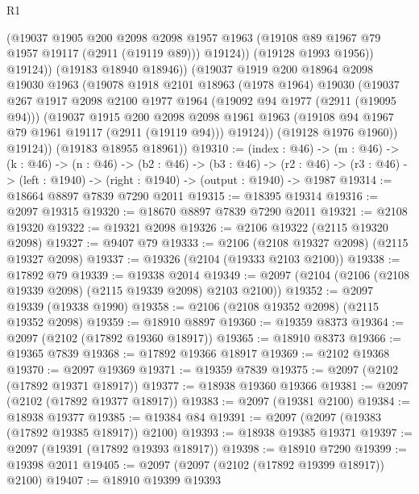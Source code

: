 \begin{lexlean}{R1}
\begin{coremodule}
                  (@19037
                    @1905
                    @200
                    @2098
                    @2098
                    @1957
                    @1963
                    (@19108 @89 @1967 @79 @1957 @19117 (@2911 (@19119 @89)))
                    @19124))
                (@19128 @1993 @1956))
              @19124))
          (@19183 @18940 @18946))
        (@19037
          @1919
          @200
          @18964
          @2098
          @19030
          @1963
          (@19078
            @1918
            @2101
            @18963
            (@1978 @1964)
            @19030
            (@19037
              @267
              @1917
              @2098
              @2100
              @1977
              @1964
              (@19092 @94 @1977 (@2911 (@19095 @94)))
              (@19037
                @1915
                @200
                @2098
                @2098
                @1961
                @1963
                (@19108 @94 @1967 @79 @1961 @19117 (@2911 (@19119 @94)))
                @19124))
            (@19128 @1976 @1960))
          @19124))
      (@19183 @18955 @18961))
@19310 := (index : @46) ->
  (m : @46) ->
  (k : @46) ->
  (n : @46) ->
  (b2 : @46) ->
  (b3 : @46) ->
  (r2 : @46) -> (r3 : @46) -> (left : @1940) -> (right : @1940) -> (output : @1940) -> @1987
@19314 := @18664 @8897 @7839 @7290 @2011
@19315 := @18395 @19314
@19316 := @2097 @19315
@19320 := @18670 @8897 @7839 @7290 @2011
@19321 := @2108 @19320
@19322 := @19321 @2098
@19326 := @2106 @19322 (@2115 @19320 @2098)
@19327 := @9407 @79
@19333 := @2106 (@2108 @19327 @2098) (@2115 @19327 @2098)
@19337 := @19326 (@2104 (@19333 @2103 @2100))
@19338 := @17892 @79
@19339 := @19338 @2014
@19349 := @2097 (@2104 (@2106 (@2108 @19339 @2098) (@2115 @19339 @2098) @2103 @2100))
@19352 := @2097 @19339 (@19338 @1990)
@19358 := @2106 (@2108 @19352 @2098) (@2115 @19352 @2098)
@19359 := @18910 @8897
@19360 := @19359 @8373
@19364 := @2097 (@2102 (@17892 @19360 @18917))
@19365 := @18910 @8373
@19366 := @19365 @7839
@19368 := @17892 @19366 @18917
@19369 := @2102 @19368
@19370 := @2097 @19369
@19371 := @19359 @7839
@19375 := @2097 (@2102 (@17892 @19371 @18917))
@19377 := @18938 @19360 @19366
@19381 := @2097 (@2102 (@17892 @19377 @18917))
@19383 := @2097 (@19381 @2100)
@19384 := @18938 @19377
@19385 := @19384 @84
@19391 := @2097 (@2097 (@19383 (@17892 @19385 @18917)) @2100)
@19393 := @18938 @19385 @19371
@19397 := @2097 (@19391 (@17892 @19393 @18917))
@19398 := @18910 @7290
@19399 := @19398 @2011
@19405 := @2097 (@2097 (@2102 (@17892 @19399 @18917)) @2100)
@19407 := @18910 @19399 @19393

\end{coremodule}
\end{lexlean}
